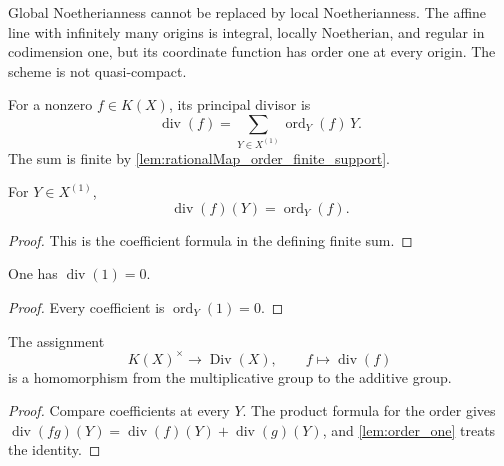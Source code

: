\begin{remark}
  \label{rem:finite_support_needs_noetherian}
  Global Noetherianness cannot be replaced by local Noetherianness.  The
  affine line with infinitely many origins is integral, locally Noetherian,
  and regular in codimension one, but its coordinate function has order one
  at every origin.  The scheme is not quasi-compact.
\end{remark}

\begin{definition}
  \label{def:principal_divisor}
  \leanok

  For a nonzero \(f\in K(X)\), its principal divisor is
  \[
    \operatorname{div}(f)
      =\sum_{Y\in X^{(1)}}\operatorname{ord}_Y(f)\,Y.
  \]
  The sum is finite by \cref{lem:rationalMap_order_finite_support}.
\end{definition}

\begin{lemma}
  \label{lem:principal_apply}
  \leanok
  For \(Y\in X^{(1)}\),
  \[
    \operatorname{div}(f)(Y)=\operatorname{ord}_Y(f).
  \]
\end{lemma}
\begin{proof}
  \leanok
  This is the coefficient formula in the defining finite sum.
\end{proof}

\begin{lemma}
  \label{lem:principal_one}
  \leanok
  One has \(\operatorname{div}(1)=0\).
\end{lemma}
\begin{proof}
  \leanok
  Every coefficient is \(\operatorname{ord}_Y(1)=0\).
\end{proof}

\begin{theorem}
  \label{thm:principal_hom}
  \leanok

  The assignment
  \[
    K(X)^\times\longrightarrow\operatorname{Div}(X),
    \qquad f\longmapsto\operatorname{div}(f)
  \]
  is a homomorphism from the multiplicative group to the additive group.
\end{theorem}
\begin{proof}
  \leanok
  Compare coefficients at every \(Y\).  The product formula for the order
  gives
  \(\operatorname{div}(fg)(Y)=\operatorname{div}(f)(Y)
    +\operatorname{div}(g)(Y)\), and \cref{lem:order_one} treats the
  identity.
\end{proof}

